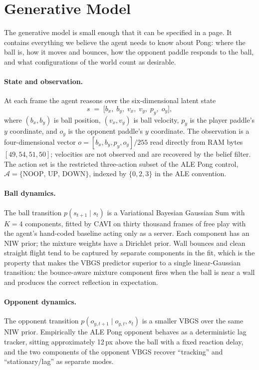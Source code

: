 \documentclass[runningheads]{llncs}
\begin{document}
\section{Generative Model}\label{sec:model}

The generative model is small enough that it can be specified in a
page. It contains everything we believe the agent needs to know
about Pong: where the ball is, how it moves and bounces, how the
opponent paddle responds to the ball, and what configurations of
the world count as desirable.

\paragraph{State and observation.}
At each frame the agent reasons over the six-dimensional latent
state
\[
  s \;=\; \bigl[b_x,\;b_y,\;v_x,\;v_y,\;p_y,\;o_y\bigr],
\]
where $(b_x, b_y)$ is ball position, $(v_x, v_y)$ is ball velocity,
$p_y$ is the player paddle's $y$ coordinate, and $o_y$ is the
opponent paddle's $y$ coordinate. The observation is a
four-dimensional vector
$o = [b_x, b_y, p_y, o_y]/255$ read directly from RAM bytes
$[49, 54, 51, 50]$; velocities are not observed and are recovered by
the belief filter. The action set is the restricted three-action
subset of the ALE Pong control,
$\mathcal{A} = \{\text{NOOP},\,\text{UP},\,\text{DOWN}\}$, indexed
by $\{0, 2, 3\}$ in the ALE convention.

\paragraph{Ball dynamics.}
The ball transition $p(s_{t+1}\mid s_t)$ is a Variational Bayesian
Gaussian Sum with $K{=}4$ components, fitted by CAVI on thirty
thousand frames of free play with the agent's hand-coded baseline
acting only as a server. Each component has an NIW prior; the
mixture weights have a Dirichlet prior. Wall bounces and clean
straight flight tend to be captured by separate components in the
fit, which is the property that makes the VBGS predictor superior
to a single linear-Gaussian transition: the bounce-aware mixture
component fires when the ball is near a wall and produces the
correct reflection in expectation.

\paragraph{Opponent dynamics.}
The opponent transition $p(o_{y,t+1}\mid o_{y,t}, s_t)$ is a smaller
VBGS over the same NIW prior. Empirically the ALE Pong opponent
behaves as a deterministic lag tracker, sitting approximately
12\,px above the ball with a fixed reaction delay, and the two
components of the opponent VBGS recover ``tracking'' and
``stationary/lag'' as separate modes.
\end{document}
